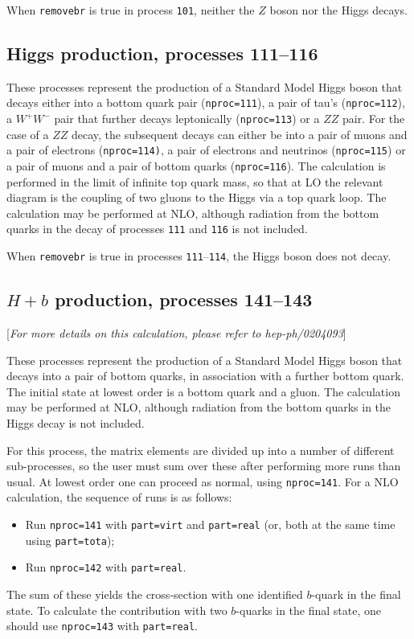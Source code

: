 \documentclass[12pt]{article}
\begin{document}
When {\tt removebr} is true in process {\tt 101}, neither the $Z$ boson
nor the Higgs decays.

\subsection{Higgs production, processes 111--116}
\label{subsec:h}

These processes represent the production of a Standard Model Higgs
boson that decays either into a bottom quark
pair ({\tt nproc=111}), a pair of tau's ({\tt nproc=112}), a $W^+W^-$ pair
that further decays leptonically ({\tt nproc=113}) or a $ZZ$ pair.
For the case of a $ZZ$ decay,
the subsequent decays can either be into a pair of muons and a pair of electrons
({\tt nproc=114)}, a pair of electrons and neutrinos ({\tt nproc=115}) or
a pair of muons and a pair of bottom quarks ({\tt nproc=116}).
The calculation is performed in the
limit of infinite top quark mass, so that at LO the relevant diagram
is the coupling of two gluons to the Higgs via a top quark loop.
The calculation may be performed at NLO, although radiation from the
bottom quarks in the decay of processes {\tt 111} and {\tt 116} is not included.

When {\tt removebr} is true in processes {\tt 111}--{\tt 114},
the Higgs boson does not decay.

\subsection{$H+b$ production, processes 141--143}
\label{subsec:Hb}

\begin{center}
[{\it For more details on this calculation, please refer to hep-ph/0204093}]
\end{center}

These processes represent the production of a Standard Model Higgs
boson that decays into a pair of bottom quarks,
in association with a further bottom quark. The initial state at lowest order
is a bottom quark and a gluon.
The calculation may be performed at NLO, although radiation from the
bottom quarks in the Higgs decay is not included.

For this process, the matrix elements are divided up into a number of
different sub-processes, so the user must sum over these after performing
more runs than usual. At lowest order one can proceed as normal, using
{\tt nproc=141}. For a NLO calculation, the sequence of runs is as follows:
\begin{itemize}
\item Run {\tt nproc=141} with {\tt part=virt} and {\tt part=real} (or, both
at the same time using {\tt part=tota});
\item Run {\tt nproc=142} with {\tt part=real}.
\end{itemize}
The sum of these yields the cross-section with one identified $b$-quark in
the final state. To calculate the contribution with two $b$-quarks in the
final state, one should use {\tt nproc=143} with {\tt part=real}.
\end{document}
